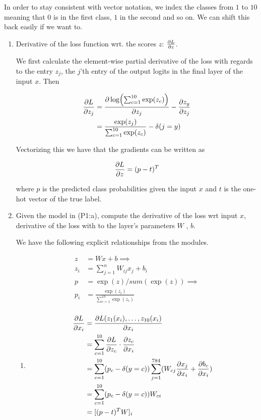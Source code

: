 \documentclass{article}
\begin{document}
In order to stay consistent with vector notation, we index the classes from $1$
to $10$ meaning that $0$ is in the first class, $1$ in the second and so on. We
can shift this back easily if we want to.

\begin{enumerate}[label=(\roman*)]
\item Derivative of the loss function wrt. the scores $z$: $\pdv{L}{z}$.
  
  We first calculate the element-wise partial derivative of the loss with regards
  to the entry $z_j$, the $j$'th entry of the output logits in the final layer
  of the input $x$. Then
  
  \begin{align*}
    \pdv{L}{z_j} & = \pdv{\log(\sum_{c=1}^{10} \exp(z_{c}))}{z_j} - \pdv{z_{y}}{z_j} \\
                        & = \frac{\exp( z_j ) }{ \sum_{c=1}^{10} \exp(z_{c}) }  - \delta(j = y)
  \end{align*}

  Vectorizing this we have that the gradients can be written as

  \begin{equation*}
    \pdv{L}{z} = (p - t)^T
  \end{equation*}

  where $p$ is the predicted class probabilities given the input $x$ and $t$ is
  the one-hot vector of the true label.

\item Given the model in (P1:a), compute the derivative of the loss wrt input $x$,
  derivative of the loss with to the layer’s parameters $W$ , $b$.

  We have the following explicit relationships from the modules.
  
  \begin{align*}
    z & = Wx + b \implies \\
    z_i & = \sum_{j=1}^n W_{ij} x_j + b_i \\
    p & =  \exp(z) / sum(\exp(z)) \implies \\
    p_i & = \frac{\exp(z_{i})}{\sum_{c=1}^{10} \exp(z_{c})} \\
  \end{align*}

  \begin{enumerate}
  \item

    \begin{align*}
      \pdv{L}{x_i} & = \pdv{L(z_1(x_i), \dots, z_{10}(x_i)}{x_i} \\
                   & = \sum_{c=1}^{10} \pdv{L}{z_{c}} \cdot \pdv{z_c}{x_i} \\
                   & = \sum_{c=1}^{10}(p_c - \delta(y = c)) \sum_{j=1}^{784} ( W_{cj} \pdv{x_j}{x_i} + \pdv{b_c}{x_i} ) \\
                   & = \sum_{c=1}^{10}(p_c - \delta(y = c))W_{ci} \\
                   & = [(p - t)^TW]_i
    \end{align*}


\end{enumerate}
\end{enumerate}
\end{document}
